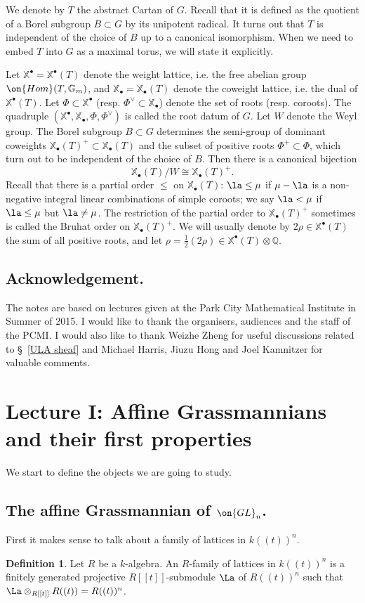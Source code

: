 \documentclass[]{pcmi}
\theoremstyle{plain}
\theoremstyle{remark}
\theoremstyle{definition}
\newtheorem{dfn}[equation]{Definition}
\newcommand{\bG}{{\mathbb G}}
\newcommand{\bQ}{{\mathbb Q}}
\newcommand{\Hom}{{\on{Hom}}}
\newcommand{\GL}{{\on{GL}}}
\def\xcoch{\mathbb{X}_\bullet}
\def\xch{\mathbb{X}^\bullet}
\begin{document}
We denote by $T$ the abstract Cartan of $G$. Recall that it is defined as the quotient of a Borel subgroup $B\subset G$ by its unipotent radical. It turns out that $T$ is independent of the choice of $B$ up to a canonical isomorphism. When we need to embed $T$ into $G$ as a maximal torus, we will state it explicitly.

Let $\xch=\xch(T)$ denote the weight lattice, i.e. the free abelian group $\Hom(T,\bG_m)$, and $\xcoch=\xcoch(T)$ denote the coweight lattice, i.e. the dual of $\xch(T)$. Let $\Phi\subset \xch$ (resp. $\Phi^\vee\subset \xcoch$) denote the set of roots (resp. coroots). The quadruple $(\xch,\xcoch,\Phi,\Phi^\vee)$ is called the root datum of $G$. Let $W$ denote the Weyl group. The Borel subgroup $B\subset G$ determines the semi-group of dominant coweights $\xcoch(T)^+\subset \xcoch(T)$ and the subset of positive roots $\Phi^+\subset\Phi$, which turn out to be independent of the choice of $B$.  Then there is a canonical bijection
 \[\xcoch(T)/W\cong \xcoch(T)^+.\]
Recall that there is a partial order $\leq$ on $\xcoch(T)$: $\la\leq \mu$ if $\mu-\la$ is a non-negative integral linear combinations of simple coroots; we say $\la<\mu$ if $\la\leq \mu$ but $\la\neq \mu$. The restriction of the partial order to $\xcoch(T)^+$ sometimes is called the Bruhat order on $\xcoch(T)^+$. 
We will usually denote by $2\rho\in\xch(T)$ the sum of all positive roots, and let $\rho=\frac{1}{2}(2\rho)\in \xch(T)\otimes\bQ$.

\subsection{Acknowledgement.} The notes are based on lectures given at the Park City Mathematical Institute in Summer of 2015. I would like to thank the organisers, audiences and the staff of the PCMI. I would also like to thank Weizhe Zheng for useful discussions related to \S~\ref{ULA sheaf} and  Michael Harris, Jiuzu Hong and Joel Kamnitzer for valuable comments.

\section{Lecture I: Affine Grassmannians and their first properties}\label{Lecture I}
We start to define the objects we are going to study.


\subsection{The affine Grassmannian of $\GL_n$.}\label{aff GLn}
First it makes sense to talk about a family of lattices in $k((t))^n$. 
\begin{dfn}
Let $R$ be a $k$-algebra. An $R$-family of lattices in $k((t))^n$ is a finitely generated projective $R[[t]]$-submodule $\La$ of $R((t))^n$ such that $\La\otimes_{R[[t]]}R((t))=R((t))^n$. 
\end{dfn}
\end{document}
